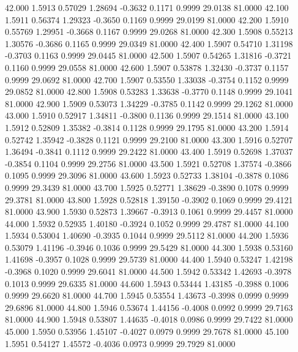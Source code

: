   42.000   1.5913   0.57029   1.28694  -0.3632   0.1171   0.9999  29.0138  81.0000
  42.100   1.5911   0.56374   1.29323  -0.3650   0.1169   0.9999  29.0199  81.0000
  42.200   1.5910   0.55769   1.29951  -0.3668   0.1167   0.9999  29.0268  81.0000
  42.300   1.5908   0.55213   1.30576  -0.3686   0.1165   0.9999  29.0349  81.0000
  42.400   1.5907   0.54710   1.31198  -0.3703   0.1163   0.9999  29.0445  81.0000
  42.500   1.5907   0.54265   1.31816  -0.3721   0.1160   0.9999  29.0558  81.0000
  42.600   1.5907   0.53878   1.32430  -0.3737   0.1157   0.9999  29.0692  81.0000
  42.700   1.5907   0.53550   1.33038  -0.3754   0.1152   0.9999  29.0852  81.0000
  42.800   1.5908   0.53283   1.33638  -0.3770   0.1148   0.9999  29.1041  81.0000
  42.900   1.5909   0.53073   1.34229  -0.3785   0.1142   0.9999  29.1262  81.0000
  43.000   1.5910   0.52917   1.34811  -0.3800   0.1136   0.9999  29.1514  81.0000
  43.100   1.5912   0.52809   1.35382  -0.3814   0.1128   0.9999  29.1795  81.0000
  43.200   1.5914   0.52742   1.35942  -0.3828   0.1121   0.9999  29.2100  81.0000
  43.300   1.5916   0.52707   1.36494  -0.3841   0.1112   0.9999  29.2422  81.0000
  43.400   1.5919   0.52698   1.37037  -0.3854   0.1104   0.9999  29.2756  81.0000
  43.500   1.5921   0.52708   1.37574  -0.3866   0.1095   0.9999  29.3096  81.0000
  43.600   1.5923   0.52733   1.38104  -0.3878   0.1086   0.9999  29.3439  81.0000
  43.700   1.5925   0.52771   1.38629  -0.3890   0.1078   0.9999  29.3781  81.0000
  43.800   1.5928   0.52818   1.39150  -0.3902   0.1069   0.9999  29.4121  81.0000
  43.900   1.5930   0.52873   1.39667  -0.3913   0.1061   0.9999  29.4457  81.0000
  44.000   1.5932   0.52935   1.40180  -0.3924   0.1052   0.9999  29.4787  81.0000
  44.100   1.5934   0.53004   1.40690  -0.3935   0.1044   0.9999  29.5112  81.0000
  44.200   1.5936   0.53079   1.41196  -0.3946   0.1036   0.9999  29.5429  81.0000
  44.300   1.5938   0.53160   1.41698  -0.3957   0.1028   0.9999  29.5739  81.0000
  44.400   1.5940   0.53247   1.42198  -0.3968   0.1020   0.9999  29.6041  81.0000
  44.500   1.5942   0.53342   1.42693  -0.3978   0.1013   0.9999  29.6335  81.0000
  44.600   1.5943   0.53444   1.43185  -0.3988   0.1006   0.9999  29.6620  81.0000
  44.700   1.5945   0.53554   1.43673  -0.3998   0.0999   0.9999  29.6896  81.0000
  44.800   1.5946   0.53674   1.44156  -0.4008   0.0992   0.9999  29.7163  81.0000
  44.900   1.5948   0.53807   1.44635  -0.4018   0.0986   0.9999  29.7422  81.0000
  45.000   1.5950   0.53956   1.45107  -0.4027   0.0979   0.9999  29.7678  81.0000
  45.100   1.5951   0.54127   1.45572  -0.4036   0.0973   0.9999  29.7929  81.0000
